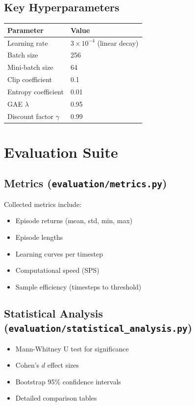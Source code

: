 \documentclass[12pt,a4paper,openany]{report}
\begin{document}
\subsection{Key Hyperparameters}

\begin{table}[H]
\centering
\small
\begin{tabular}{ll}
\toprule
Parameter & Value \\
\midrule
Learning rate & $3 \times 10^{-4}$ (linear decay) \\
Batch size & 256 \\
Mini-batch size & 64 \\
Clip coefficient & 0.1 \\
Entropy coefficient & 0.01 \\
GAE $\lambda$ & 0.95 \\
Discount factor $\gamma$ & 0.99 \\
\bottomrule
\end{tabular}
\end{table}

\section{Evaluation Suite}

\subsection{Metrics (\texttt{evaluation/metrics.py})}

Collected metrics include:

\begin{itemize}
    \item Episode returns (mean, std, min, max)
    \item Episode lengths
    \item Learning curves per timestep
    \item Computational speed (SPS)
    \item Sample efficiency (timesteps to threshold)
\end{itemize}

\subsection{Statistical Analysis (\texttt{evaluation/statistical\_analysis.py})}

\begin{itemize}
    \item Mann-Whitney U test for significance
    \item Cohen's $d$ effect sizes
    \item Bootstrap 95\% confidence intervals
    \item Detailed comparison tables
\end{itemize}
\end{document}
